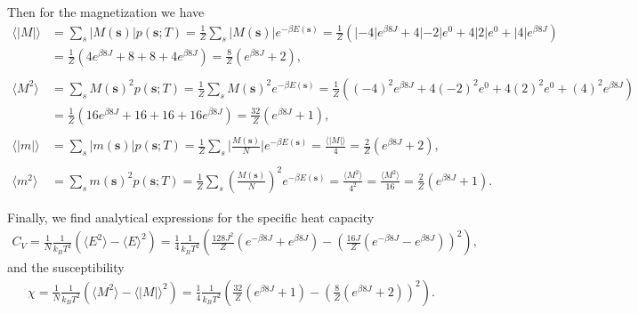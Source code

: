 \documentclass[english,notitlepage,reprint,nofootinbib]{revtex4-1}  %
\begin{document}
Then for the magnetization we have
\begin{align*}
    \langle |M| \rangle &=  \sum_s |M(\textbf{s})|  p(\textbf{s};T) 
    = \frac{1}{Z} \sum_s |M(\textbf{s})| e^{-\beta E(\textbf{s})} 
    = \frac{1}{Z} \left( |-4|e^{\beta8J} + 4 |-2| e^0 + 4|2|e^0 + |4|e^{\beta 8J}\right) \\
    &= \frac{1}{Z} \left( 4e^{\beta8J} + 8 + 8 + 4e^{\beta 8J}\right)
    = \frac{8}{Z} \left( e^{\beta 8J} + 2 \right),
\\
\\
    \langle M^2 \rangle &= \sum_s M(\textbf{s})^2  p(\textbf{s};T) 
    = \frac{1}{Z} \sum_s M(\textbf{s})^2 e^{-\beta E(\textbf{s})} 
    = \frac{1}{Z} \left( (-4)^2 e^{\beta8J} + 4 (-2)^2 e^0 + 4(2)^2 e^0 + (4)^2 e^{\beta 8J}\right) \\
    &= \frac{1}{Z} \left( 16 e^{\beta8J} + 16 + 16 + 16 e^{\beta 8J}\right)
    = \frac{32}{Z} \left( e^{\beta 8J} + 1 \right),
\\
\\
    \langle |m| \rangle&= \sum_s |m(\textbf{s})|  p(\textbf{s};T) 
    = \frac{1}{Z} \sum_s \bigg| \frac{M(\textbf{s})}{N} \bigg| e^{-\beta E(\textbf{s})}
    = \frac{\langle|M| \rangle}{4}
    = \frac{2}{Z} \left( e^{\beta 8J} + 2 \right),
\\
\\
    \langle m^2 \rangle &= \sum_s m(\textbf{s})^2  p(\textbf{s};T)
    = \frac{1}{Z} \sum_s \left( \frac{M(\textbf{s})}{N} \right)^2 e^{-\beta E(\textbf{s})}
    = \frac{ \langle M^2 \rangle}{4^2}
    = \frac{ \langle M^2 \rangle}{16}
    = \frac{2}{Z} \left( e^{\beta 8J} + 1 \right).
\end{align*}

Finally, we find analytical expressions for the specific heat capacity
\begin{align*}
    C_V = \frac{1}{N} \frac{1}{k_B T^2} \left( \langle E^2 \rangle - \langle E \rangle^2 \right)
    = \frac{1}{4} \frac{1}{k_B T^2} \left( \frac{128 J^2}{Z} \left( e^{-\beta 8J} + e^{\beta 8J} \right) - \left( \frac{16J}{Z} \left( e^{-\beta 8J} - e^{\beta 8J} \right) \right)^2 \right)
    ,
\end{align*}
and the susceptibility
\begin{align*}
    \chi = \frac{1}{N} \frac{1}{k_B T^2} \left( \langle M^2 \rangle - \langle |M| \rangle^2 \right)
    = \frac{1}{4} \frac{1}{k_B T^2} \left( \frac{32}{Z} \left( e^{\beta 8J} + 1 \right) - \left( \frac{8}{Z} \left( e^{\beta 8J} + 2 \right) \right)^2 \right).
\end{align*}
\end{document}
